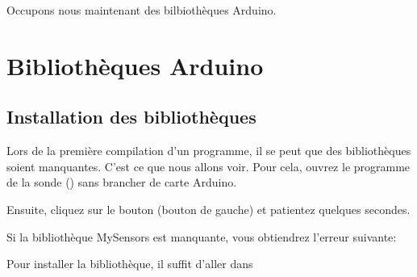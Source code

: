   

  Occupons nous maintenant des bilbiothèques Arduino.\chapter{Bibliothèques Arduino}

\section{Installation des bibliothèques}

Lors de la première compilation d'un programme, il se peut que des bibliothèques soient manquantes.
C'est ce que nous allons voir. Pour cela, ouvrez le programme de la sonde () sans brancher de carte Arduino.

Ensuite, cliquez sur le bouton  (bouton de gauche) et patientez quelques secondes.\\


Si la bibliothèque MySensors est manquante, vous obtiendrez l'erreur suivante: 


Pour installer la bibliothèque, il suffit d'aller dans 


